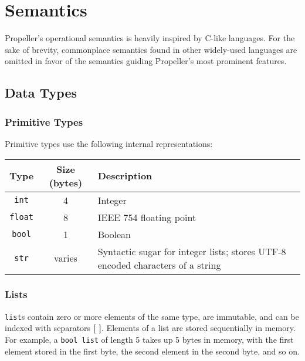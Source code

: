 \section{Semantics}



Propeller's operational semantics is heavily inspired by C-like languages. For the sake of
brevity, commonplace semantics found in other widely-used languages are omitted in
favor of the semantics guiding Propeller's most prominent features.


\subsection{Data Types}

\subsubsection{Primitive Types}
Primitive types use the following internal representations:
\begin{center}
\begin{tabular}{| c | c | p{8cm} | }
\hline
 \textbf{Type} & \textbf{Size (bytes)} & \textbf{Description} \\
 \hline
 \texttt{int} & 4 & Integer \\
 \hline
 \texttt{float} & 8 & IEEE 754 floating point \\
 \hline
 \texttt{bool} & 1 & Boolean \\
 \hline
 \texttt{str} & varies & Syntactic sugar for integer lists; stores UTF-8 encoded characters of a
 string \\
\hline
\end{tabular}
\end{center}

\subsubsection{Lists}
\texttt{list}s contain zero or more elements of the same type, are immutable, and can be
indexed with separators \textbf{[ ]}. Elements of a list are stored sequentially in memory.
For example, a \texttt{bool list} of length 5 takes up 5 bytes in memory, with the first element
stored in the first byte, the second element in the second byte, and so on.


